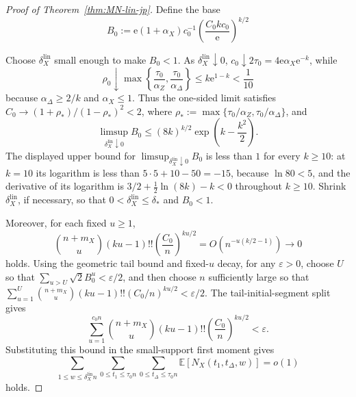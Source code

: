 \documentclass[11pt]{article}
\theoremstyle{definition}
\newcommand{\EE}{\mathbb E}
\newcommand{\NX}{N_X}
\begin{document}
\begin{proof}[Proof of Theorem~\ref{thm:MN-lin-jp}]
Define the base
\begin{equation}\label{eq:mnlin-small-base-jp}
B_0:=\mathrm{e}(1+\alpha_X)c_0^{-1}\left(\frac{C_0kc_0}{\mathrm{e}}\right)^{k/2}
\end{equation}

Choose \(\delta_X^{\mathrm{lin}}\) small enough to make \(B_0<1\). As \(\delta_X^{\mathrm{lin}}\downarrow0\), \(c_0\downarrow2\tau_0=4\mathrm{e}\alpha_X\mathrm{e}^{-k}\), while
\[
\rho_0\downarrow
\max\left\{\frac{\tau_0}{\alpha_Z},\frac{\tau_0}{\alpha_\Delta}\right\}
\le k\mathrm{e}^{1-k}<\frac1{10}
\]
because \(\alpha_\Delta\ge2/k\) and \(\alpha_X\le1\). Thus the one-sided limit satisfies \(C_0\to(1+\rho_*)/(1-\rho_*)^2<2\), where
\(\rho_*:=\max\{\tau_0/\alpha_Z,\tau_0/\alpha_\Delta\}\), and
\[
\limsup_{\delta_X^{\mathrm{lin}}\downarrow0} B_0
\le
(8k)^{k/2}\exp\!\left(k-\frac{k^2}{2}\right).
\]
The displayed upper bound for \(\limsup_{\delta_X^{\mathrm{lin}}\downarrow0} B_0\) is less than \(1\) for every \(k\ge10\): at \(k=10\) its logarithm is less than
\(5\cdot5+10-50=-15\), because \(\ln80<5\), and the derivative of its logarithm is
\(3/2+\frac12\ln(8k)-k<0\) throughout \(k\ge10\).
Shrink \(\delta_X^{\mathrm{lin}}\), if necessary, so that \(0<\delta_X^{\mathrm{lin}}\le\delta_*\) and \(B_0<1\).

Moreover, for each fixed \(u\ge 1\),
\begin{equation*}
\binom{n+m_X}{u}(ku-1)!!\left(\frac{C_0}{n}\right)^{ku/2}
=O\!\left(n^{-u(k/2-1)}\right)\to 0
\end{equation*}
holds.
Using the geometric tail bound and fixed-\(u\) decay, for any \(\varepsilon>0\), choose \(U\) so that
\(\sum_{u>U}\sqrt{2}B_0^u<\varepsilon/2\),
and then choose \(n\) sufficiently large so that
\(\sum_{u=1}^{U}\binom{n+m_X}{u}(ku-1)!!(C_0/n)^{ku/2}<\varepsilon/2\).
The tail-initial-segment split gives
\begin{equation*}
\sum_{u=1}^{c_0 n}
\binom{n+m_X}{u}(ku-1)!!\left(\frac{C_0}{n}\right)^{ku/2}
<\varepsilon.
\end{equation*}
Substituting this bound in the small-support first moment gives
\begin{equation*}
\sum_{1\le w\le \delta_X^{\mathrm{lin}}n}
\sum_{0\le t_1\le \tau_0 n}
\sum_{0\le t_\Delta\le \tau_0 n}
\EE[\NX(t_1,t_\Delta,w)]
=o(1)
\end{equation*}
holds.


\end{proof}
\end{document}
